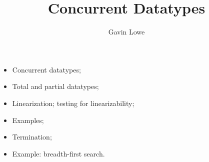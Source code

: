 \documentclass[notes,color]{sepslide0}
\title{Concurrent Datatypes}
\author{Gavin Lowe}
\begin{document}
\begin{slide}
  
  \Title


\end{slide}






\begin{slide}

\begin{itemize}
\item 
Concurrent datatypes;

\item
Total and partial datatypes;

\item
Linearization; testing for linearizability;

\item
Examples;

\item 
Termination;

\item Example: breadth-first search.
\end{itemize}
\end{slide}
\end{document}
